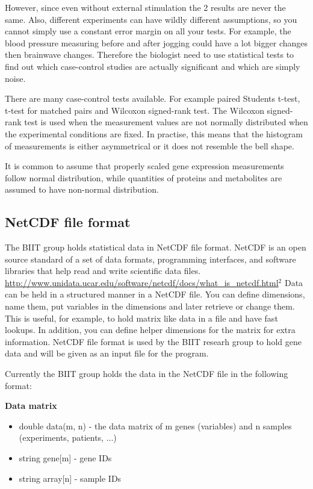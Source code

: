\documentclass[12pt]{article}
\begin{document}
However, since even without external stimulation the 2 results are never the same. Also, different experiments can have wildly different assumptions, so you cannot simply use a constant error margin on all your tests. For example, the blood pressure measuring before and after jogging could have a lot bigger changes then brainwave changes.  Therefore  the biologist need to use statistical tests to find out which case-control studies are actually significant and which are simply noise.

There are many case-control tests available. For example paired Students t-test, t-test for matched pairs and Wilcoxon signed-rank test. The Wilcoxon signed-rank test is used when the measurement values are not normally distributed when the experimental conditions are fixed.  In practise, this means that the histogram of measurements is either asymmetrical or it does not resemble the bell shape.

It is common to assume that properly scaled gene expression measurements follow normal distribution, while quantities of proteins and metabolites are assumed to have non-normal distribution.

\subsection{NetCDF file format}
The BIIT group holds statistical data in NetCDF file format. NetCDF is an open source standard of a set of data formats, programming interfaces, and software libraries that help read and write scientific data files. \url{http://www.unidata.ucar.edu/software/netcdf/docs/what_is_netcdf.html}$^2$
Data can be held in a structured manner in a NetCDF file. You can define dimensions, name them, put variables in the dimensions and later retrieve or change them. This is useful, for example, to hold matrix like data in a file and have fast lookups. In addition, you can define helper dimensions for the matrix for extra information.
NetCDF file format is used by the BIIT researh group to hold gene data and will be given as an input file for the program.

Currently the BIIT group holds the data in the NetCDF file in the following format:

\textbf{Data matrix}
\begin{itemize}
  \item double data(m, n) - the data matrix of m genes (variables) and n samples (experiments, patients, ...)
  \item string gene[m] - gene IDs
  \item string array[n] - sample IDs
\end{itemize}
\end{document}
